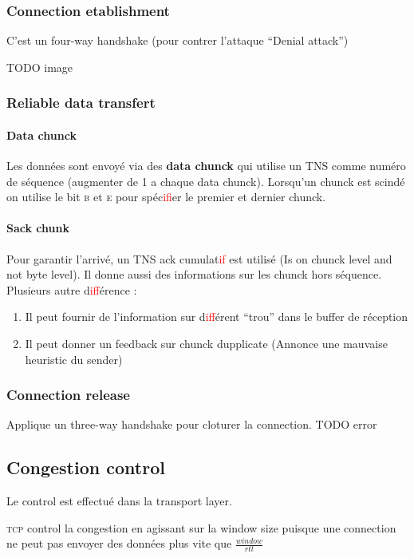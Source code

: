 \subsubsection{Connection etablishment}
C'est un four-way handshake (pour contrer l'attaque ``Denial attack'')

TODO image

\subsubsection{Reliable data transfert}

\paragraph{Data chunck}
Les données sont envoyé via des \textbf{data chunck} qui utilise un TNS comme
numéro de séquence (augmenter de 1 a chaque data chunck). Lorsqu'un chunck est
scindé on utilise le bit \textsc{b} et \textsc{e} pour spéc\textcolor{red}{if}ier le premier et dernier
chunck.

\paragraph{Sack chunk}
Pour garantir l'arrivé, un TNS ack cumulat\textcolor{red}{if} est utilisé (Is on chunck level and not
byte level). Il donne aussi des informations sur les chunck hors séquence.
Plusieurs autre d\textcolor{red}{if}férence :
\begin{enumerate}
    \item Il peut fournir de l'information sur d\textcolor{red}{if}férent ``trou'' dans le buffer de réception
    \item Il peut donner un feedback sur chunck dupplicate (Annonce une mauvaise heuristic du sender)
\end{enumerate}

\subsubsection{Connection release}
Applique un three-way handshake pour cloturer la connection.
TODO error

\subsection{Congestion control}
Le control est effectué dans la transport layer.

\textsc{tcp} control la congestion en agissant sur la window size puisque une connection
ne peut pas envoyer des données plus vite que $\frac{window}{rtt}$

